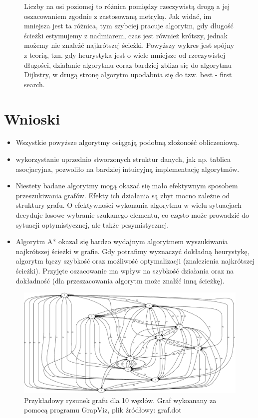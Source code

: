 \documentclass[a4paper,11pt]{article}
\begin{document}
\begin{enumerate}
\begin{figure}[th]
Liczby na osi poziomej to różnica pomiędzy rzeczywistą drogą a jej oszacowaniem zgodnie z zastosowaną metryką. Jak widać, im mniejsza jest ta różnica,
tym szybciej pracuje algorytm, gdy długość ścieżki estymujemy z nadmiarem, czas jest również krótszy, jednak możemy nie znaleźć najkrótszej ścieżki.
Powyższy wykres jest spójny z teorią, tzn. gdy heurystyka jest o wiele mniejsze od rzeczywistej długości, działanie algorytmu coraz bardziej zbliza się do algorytmu Dijkstry, w 
drugą stronę algorytm upodabnia się do tzw. best - first search.

\end{figure} 

\end{enumerate}

\section{Wnioski}

\begin{itemize}
\item Wszystkie powyższe algorytmy osiągają podobną złożoność obliczeniową.

\item wykorzystanie uprzednio stworzonych struktur danych, jak np. tablica asocjacyjna, pozwoliło na bardziej intuicyjną implementację algorytmów.

\item Niestety badane algorytmy mogą okazać się mało efektywnym sposobem przeszukiwania grafów. Efekty ich działania są zbyt mocno zależne od struktury grafu. O efektywności 
wykonania algorytmu w wielu sytuacjach decyduje losowe wybranie szukanego elementu, co często może prowadzić do sytuacji optymistycznej, ale także pesymistycznej.
\item Algorytm A* okazał się bardzo wydajnym algorytmem wyszukiwania najkrótszej ścieżki w grafie. Gdy potrafimy wyznaczyć dokładną heurystykę, algorytm łączy szybkość oraz 
możliwość optymalizacji (znalezienia najkrótszej ścieżki). Przyjęte oszacowanie ma wpływ na szybkość działania oraz na dokładność (dla przeszacowania algorytm może znalźć inną ścieżkę).

\end{itemize}

\begin{figure}[th]
\centering
\includegraphics[width = 1\textwidth]{../prj/graf.dot.eps}
\caption{Przykładowy rysunek grafu dla 10 węzłów. Graf wykoanany za pomocą programu GrapViz, plik źródłowy: graf.dot}
\label{graf}
\end{figure} 
\end{document}
